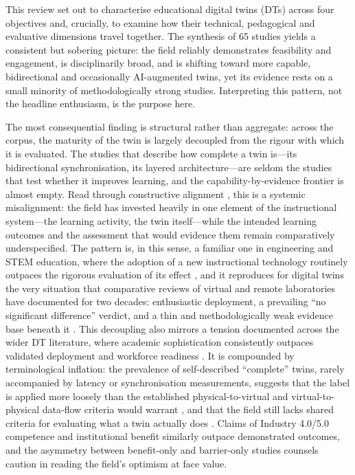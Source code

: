 This review set out to characterise educational digital twins (DTs) across four
objectives and, crucially, to examine how their technical, pedagogical and
evaluative dimensions travel together. The synthesis of 65 studies yields a
consistent but sobering picture: the field reliably demonstrates feasibility and
engagement, is disciplinarily broad, and is shifting toward more capable,
bidirectional and occasionally AI-augmented twins, yet its evidence rests on a
small minority of methodologically strong studies. Interpreting this pattern, not
the headline enthusiasm, is the purpose here.

The most consequential finding is structural rather than aggregate: across the
corpus, the maturity of the twin is largely decoupled from the rigour with which
it is evaluated. The studies that describe how complete a twin is---its
bidirectional synchronisation, its layered architecture---are seldom the studies
that test whether it improves learning, and the capability-by-evidence frontier
is almost empty. Read through constructive alignment \citep{biggs_enhancing_1996, biggs_teaching_2011}, this is a systemic misalignment: the field has invested
heavily in one element of the instructional system---the learning activity, the
twin itself---while the intended learning outcomes and the assessment that would
evidence them remain comparatively underspecified. The pattern is, in this sense,
a familiar one in engineering and STEM education, where the adoption of a new
instructional technology routinely outpaces the rigorous evaluation of its effect
\citep{henderson_facilitating_2011}, and it reproduces for digital twins the very
situation that comparative reviews of virtual and remote laboratories have
documented for two decades: enthusiastic deployment, a prevailing ``no significant
difference'' verdict, and a thin and methodologically weak evidence base beneath it
\citep{brinson_learning_2015, heradio_virtual_2016}. This decoupling also mirrors a
tension documented across the wider DT
literature, where academic sophistication consistently outpaces validated
deployment and workforce readiness \citep{chen_ai-enhanced_2025}. It is compounded by
terminological inflation: the prevalence of self-described ``complete'' twins,
rarely accompanied by latency or synchronisation measurements, suggests that the
label is applied more loosely than the established physical-to-virtual and
virtual-to-physical data-flow criteria would warrant \citep{thelen_comprehensive_2022}, and
that the field still lacks shared criteria for evaluating what a twin actually
does \citep{liu_cognitive_2025}. Claims of Industry 4.0/5.0 competence and institutional
benefit similarly outpace demonstrated outcomes, and the asymmetry between
benefit-only and barrier-only studies counsels caution in reading the field's
optimism at face value.

